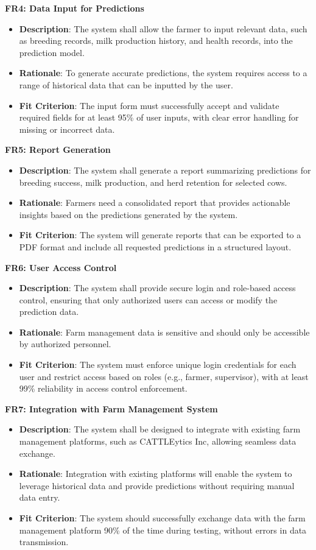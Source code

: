 \documentclass[12pt]{article}
\begin{document}
\textbf{FR4: Data Input for Predictions}
\begin{itemize}
    \item \textbf{Description}: The system shall allow the farmer to input 
    relevant data, such as breeding records, milk production history, and 
    health records, into the prediction model.
    \item \textbf{Rationale}: To generate accurate predictions, the system 
    requires access to a range of historical data that can be inputted by the user.
    \item \textbf{Fit Criterion}: The input form must successfully accept and 
    validate required fields for at least 95\% of user inputs, with clear error 
    handling for missing or incorrect data.
\end{itemize}
\textbf{FR5: Report Generation}
\begin{itemize}
    \item \textbf{Description}: The system shall generate a report summarizing 
    predictions for breeding success, milk production, and herd retention for selected cows.
    \item \textbf{Rationale}: Farmers need a consolidated report that provides 
    actionable insights based on the predictions generated by the system.
    \item \textbf{Fit Criterion}: The system will generate reports that can be 
    exported to a PDF format and include all requested predictions in a structured layout.
\end{itemize}
\textbf{FR6: User Access Control}
\begin{itemize}
    \item \textbf{Description}: The system shall provide secure login and 
    role-based access control, ensuring that only authorized users can access 
    or modify the prediction data.
    \item \textbf{Rationale}: Farm management data is sensitive and should only 
    be accessible by authorized personnel.
    \item \textbf{Fit Criterion}: The system must enforce unique login credentials 
    for each user and restrict access based on roles (e.g., farmer, supervisor), 
    with at least 99\% reliability in access control enforcement.
\end{itemize}
\textbf{FR7: Integration with Farm Management System}
\begin{itemize}
    \item \textbf{Description}: The system shall be designed to integrate with 
    existing farm management platforms, such as CATTLEytics Inc, allowing seamless 
    data exchange.
    \item \textbf{Rationale}: Integration with existing platforms will enable 
    the system to leverage historical data and provide predictions without 
    requiring manual data entry.
    \item \textbf{Fit Criterion}: The system should successfully exchange data 
    with the farm management platform 90\% of the time during testing, 
    without errors in data transmission.
\end{itemize}
\end{document}
